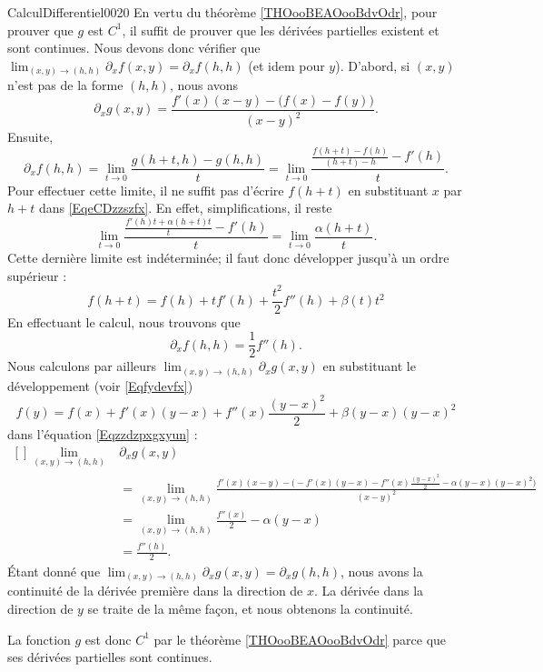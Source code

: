 \begin{corrige}{CalculDifferentiel0020}
    En vertu du théorème \ref{THOooBEAOooBdvOdr}, pour prouver que $g$ est $C^1$, il suffit de prouver que les dérivées partielles existent et sont continues. Nous devons donc vérifier que $\lim_{(x,y)\to(h,h)}\partial_xf(x,y)=\partial_xf(h,h)$ (et idem  pour $y$). D'abord, si $(x,y)$ n'est pas de la forme $(h,h)$, nous avons
	\begin{equation}		\label{Eqzzdzpxgxyun}
		\partial_xg(x,y)=\frac{ f'(x)(x-y)-\big( f(x)-f(y) \big) }{ (x-y)^2 }.
	\end{equation}
	Ensuite, 
	\begin{equation}
		\partial_xf(h,h)=\lim_{t\to 0} \frac{ g(h+t,h)-g(h,h) }{ t }=\lim_{t\to 0} \frac{ \frac{ f(h+t)-f(h) }{ (h+t)-h }-f'(h) }{ t }.
	\end{equation}
	Pour effectuer cette limite, il ne suffit pas d'écrire $f(h+t)$ en substituant $x$ par $h+t$ dans \eqref{EqeCDzzszfx}. En effet, simplifications, il reste
	\begin{equation}
		\lim_{t\to 0} \frac{ \frac{ f'(h)t+\alpha(h+t)t }{ t }-f'(h) }{ t }=\lim_{t\to 0} \frac{ \alpha(h+t) }{ t }.
	\end{equation}
	Cette dernière limite est indéterminée; il faut donc développer jusqu'à un ordre supérieur :
	\begin{equation}
		f(h+t)=f(h)+tf'(h)+\frac{ t^2 }{ 2 }f''(h)+\beta(t)t^2
	\end{equation}
	En effectuant le calcul, nous trouvons que
	\begin{equation}
		\partial_xf(h,h)=\frac{ 1 }{2}f''(h).
	\end{equation}
	Nous calculons par ailleurs $\lim_{(x,y)\to(h,h)}\partial_xg(x,y)$ en substituant le développement (voir \eqref{Eqfydevfx})
	\begin{equation}
		f(y)=f(x)+f'(x)(y-x)+f''(x)\frac{ (y-x)^2 }{2}+\beta(y-x)(y-x)^2
	\end{equation}
	dans l'équation \eqref{Eqzzdzpxgxyun} :
	\begin{equation}
		\begin{aligned}[]
			\lim_{(x,y)\to(h,h)}&\partial_xg(x,y)\\&=\lim_{(x,y)\to(h,h)}\frac{ f'(x)(x-y)-\Big( -f'(x)(y-x)-f''(x)\frac{ (y-x)^2 }{2}-\alpha(y-x)(y-x)^2 \Big) }{ (x-y)^2 }\\
			&=\lim_{(x,y)\to(h,h)}\frac{ f''(x) }{2}-\alpha(y-x)\\
			&=\frac{ f''(h) }{2}.
		\end{aligned}
	\end{equation}
	Étant donné que $\lim_{(x,y)\to(h,h)}\partial_xg(x,y)=\partial_xg(h,h)$, nous avons la continuité de la dérivée première dans la direction de $x$. La dérivée dans la direction de $y$ se traite de la même façon, et nous obtenons la continuité.

    La fonction $g$ est donc $C^1$ par le théorème \ref{THOooBEAOooBdvOdr} parce que ses dérivées partielles sont continues.

\end{corrige}
